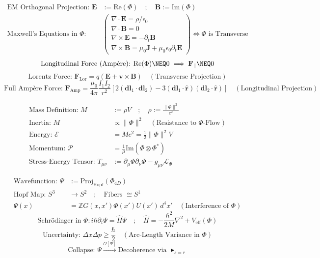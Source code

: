 \documentclass{article}
\newcommand{\AXIOM}{\blacktriangleright}
\newcommand{\DEF}{:=}
\newcommand{\IFF}{\Leftrightarrow}
\newcommand{\INT}{\mathbb{Z}}
\newcommand{\CURL}{\nabla\times}
\newcommand{\DIV}{\nabla\cdot}
\newcommand{\TENSOR}{\otimes}
\newcommand{\HERM}{^*}
\begin{document}
\begin{align*}
\text{EM Orthogonal Projection: } \mathbf{E} & \DEF \text{Re}(\Phi) \quad ; \quad \mathbf{B} \DEF \text{Im}(\Phi) \\
\text{Maxwell's Equations in } \Phi: & \begin{pmatrix} \DIV \mathbf{E} = \rho/\epsilon_0 \\ \DIV \mathbf{B} = 0 \\ \CURL \mathbf{E} = -\partial_t \mathbf{B} \\ \CURL \mathbf{B} = \mu_0 \mathbf{J} + \mu_0 \epsilon_0 \partial_t \mathbf{E} \end{pmatrix} \IFF \Phi \text{ is Transverse}
\end{align*}
\[
\text{Longitudinal Force (Ampère): } \text{Re}(\Phi) \NEQ 0 \implies \mathbf{F}_{\parallel} \NEQ 0
\]
\[
\text{Lorentz Force: } \mathbf{F}_{\text{Lor}} = q(\mathbf{E} + \mathbf{v} \times \mathbf{B}) \quad (\text{Transverse Projection})
\]
\[
\text{Full Ampère Force: } \mathbf{F}_{\text{Amp}} = \frac{\mu_0}{4\pi} \frac{I_1 I_2}{r^2} [2(\mathbf{dl}_1 \cdot \mathbf{dl}_2) - 3(\mathbf{dl}_1 \cdot \hat{\mathbf{r}})(\mathbf{dl}_2 \cdot \hat{\mathbf{r}})] \quad (\text{Longitudinal Projection})
\]

\begin{align*}
\text{Mass Definition: } M & \DEF \rho V \quad ; \quad \rho \DEF \frac{\|\Phi\|^2}{c^2} \\
\text{Inertia: } M & \propto \|\Phi\|^2 \quad (\text{Resistance to } \Phi\text{-Flow}) \\
\text{Energy: } \mathcal{E} & = M c^2 = \frac{1}{2} \|\Phi\|^2 V \\
\text{Momentum: } \mathcal{P} & = \frac{1}{\mu} \text{Im}(\Phi \TENSOR \Phi\HERM) \\
\text{Stress-Energy Tensor: } T_{\mu\nu} & \DEF \partial_\mu \Phi \partial_\nu \Phi - g_{\mu\nu} \mathcal{L}_\Phi
\end{align*}

\begin{align*}
\text{Wavefunction: } \Psi & \DEF \text{Proj}_{\text{Hopf}}(\Phi_{4D}) \\
\text{Hopf Map: } S^3 & \to S^2 \quad ; \quad \text{Fibers } \cong S^1 \\
\Psi(x) & = \INT G(x, x') \Phi(x') U(x') \, d^4x' \quad (\text{Interference of } \Phi)
\end{align*}
\[
\text{Schrödinger in } \Phi: i\hbar \partial_t \Psi = \hat{H} \Psi \quad ; \quad \hat{H} = -\frac{\hbar^2}{2M}\nabla^2 + V_{\text{eff}}(\Phi)
\]
\[
\text{Uncertainty: } \Delta x \Delta p \geq \frac{\hbar}{2} \quad (\text{Arc-Length Variance in } \Phi)
\]
\[
\text{Collapse: } \Psi \xrightarrow{\mathcal{O}[\Psi]} \text{Decoherence via } \AXIOM_{s=r}
\]
\end{document}
